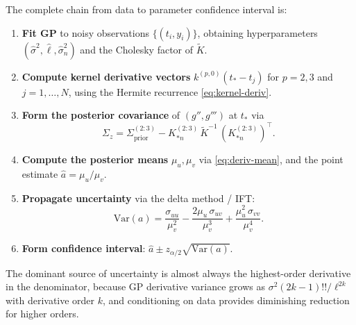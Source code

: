 \documentclass[11pt]{article}
\begin{document}
The complete chain from data to parameter confidence interval is:

\begin{enumerate}
\item \textbf{Fit GP} to noisy observations $\{(t_i, y_i)\}$, obtaining hyperparameters $(\hat\sigma^2, \hat\ell, \hat\sigma_n^2)$ and the Cholesky factor of $\tilde{K}$.

\item \textbf{Compute kernel derivative vectors} $k^{(p,0)}(t_* - t_j)$ for $p = 2, 3$ and $j = 1, \dots, N$, using the Hermite recurrence \eqref{eq:kernel-deriv}.

\item \textbf{Form the posterior covariance} of $(g'', g''')$ at $t_*$ via
\[
\Sigma_z = \Sigma_{\mathrm{prior}}^{(2:3)} - K_{*n}^{(2:3)}\, \tilde{K}^{-1}\, (K_{*n}^{(2:3)})^\top.
\]

\item \textbf{Compute the posterior means} $\mu_u, \mu_v$ via \eqref{eq:deriv-mean}, and the point estimate $\hat{a} = \mu_u / \mu_v$.

\item \textbf{Propagate uncertainty} via the delta method / IFT:
\[
\mathrm{Var}(a)
= \frac{\sigma_{uu}}{\mu_v^2}
- \frac{2\mu_u\,\sigma_{uv}}{\mu_v^3}
+ \frac{\mu_u^2\,\sigma_{vv}}{\mu_v^4}.
\]

\item \textbf{Form confidence interval}: $\hat{a} \pm z_{\alpha/2}\sqrt{\mathrm{Var}(a)}$.
\end{enumerate}

The dominant source of uncertainty is almost always the highest-order derivative in the denominator, because GP derivative variance grows as $\sigma^2(2k-1)!!/\ell^{2k}$ with derivative order $k$, and conditioning on data provides diminishing reduction for higher orders.
\end{document}
